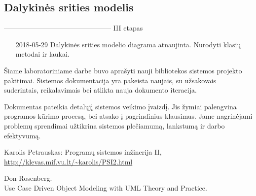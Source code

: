 \documentclass{VUMIFPSkursinis}
\begin{document}
\subsection{Dalykinės srities modelis} 
----------------------------------------------- III etapas
\begin{enumerate}
\item [2018-05-29] Dalykinės srities modelio diagrama atnaujinta. Nurodyti klasių metodai ir laukai.
\end{enumerate}

Šiame laboratoriniame darbe buvo aprašyti nauji bibliotekos sistemos projekto pakitimai. Sistemos dokumentacija yra pakeista naujais, su užsakovais suderintais, reikalavimais bei atlikta nauja dokumento iteracija.\par 
Dokumentas pateikia detalųjį sistemos veikimo įvaizdį. Jis žymiai palengvina programos kūrimo procesą, bei atsako į pagrindinius klausimus. Jame nagrinėjami problemų sprendimai užtikrina sistemos plečiamumą, lankstumą ir darbo efektyvumą.


\begin{thebibliography}{9}
Karolis Petrauskas: Programų sistemos inžinerija II,\\
\url{http://klevas.mif.vu.lt/~karolis/PSI2.html}

	Don Rosenberg.\\ Use Case Driven Object Modeling with UML Theory and Practice.

\end{thebibliography}
\end{document}

